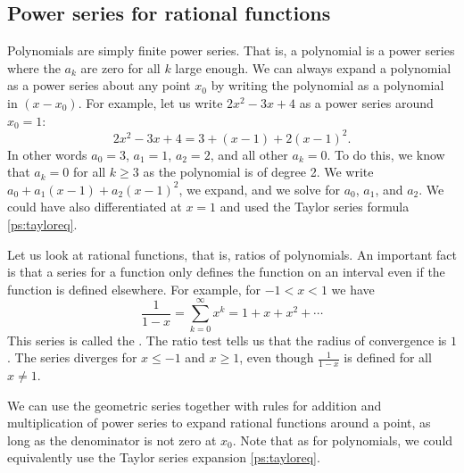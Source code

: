 \subsection{Power series for rational functions}

Polynomials are simply finite power series.  That is, a polynomial
is a power series where
the $a_k$ are zero for all $k$ large enough.  We can always expand
a polynomial as a power series about any point $x_0$ by writing
the polynomial as a polynomial in $(x-x_0)$.  For example,
let us write
$2x^2-3x+4$ as a power series around $x_0 = 1$:
\begin{equation*}
2x^2-3x+4 = 3 + (x-1) + 2{(x-1)}^2 .
\end{equation*}
In other words $a_0 = 3$, $a_1 = 1$, $a_2 = 2$, and all other
$a_k = 0$.  To do this, we know that $a_k = 0$ for all $k \geq 3$ as the
polynomial is of degree 2.
We write $a_0 + a_1(x-1) + a_2{(x-1)}^2$, we expand, and we solve
for $a_0$, $a_1$, and $a_2$.  We could have also differentiated at $x=1$
and used the Taylor series formula \eqref{ps:tayloreq}.

Let us look at rational functions, that is, ratios of polynomials.
An important fact is 
that a series for a function only defines the function
on an interval even if the function is defined elsewhere.  For example, for
$-1 < x < 1$ we have
\begin{equation*}
\frac{1}{1-x} =
\sum_{k=0}^\infty x^k =
1 + x + x^2 + \cdots
\end{equation*}
This series is called the \emph{}.  The ratio
test tells us that the radius of convergence is $1$.  The series
diverges for $x \leq -1$ and $x \geq 1$, even though
$\frac{1}{1-x}$ is defined for all $x \not= 1$.

We can use the geometric series together with rules for addition and
multiplication of power series to expand rational functions around
a point, as long as the denominator is not zero at $x_0$.  Note that
as for polynomials, we could
equivalently use the Taylor series expansion \eqref{ps:tayloreq}.

